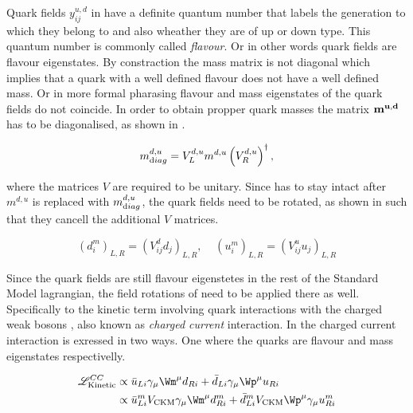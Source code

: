 Quark fields $y_{ij}^{u,d}$ in  have a definite quantum number that labels the generation to which they belong
to and also wheather they are of up or down type. This quantum number is commonly called {\it flavour}. Or in other words quark fields
are flavour eigenstates. By constraction the mass matrix is not diagonal which implies that
a quark with a well defined flavour does not have a well defined mass. Or in more formal pharasing flavour and mass eigenstates of
the quark fields do not coincide. In order to obtain propper quark masses the matrix $\bf m^{u,d}$ has to be diagonalised, as shown in .

\begin{equation}
  m^{d,u}_{\text diag} = V_L^{d,u} m^{d,u} \left(V_R^{d,u}\right)^{\dagger},
  \label{diagM}
\end{equation}

\noindent where the matrices $V$ are required to be unitary. Since  has to stay intact after $m^{d,u}$ is replaced with
$m^{d,u}_{\text diag}$, the quark fields need to be rotated, as shown in  such that they cancell the additional $V$ matrices.

\begin{equation}
  \left( d_{i}^m \right)_{L,R} = \left( V^d_{ij} d_{j} \right)_{L,R}, \;\;\;\; \left( u_{i}^m \right)_{L,R} = \left( V^u_{ij} u_{j} \right)_{L,R}
  \label{quark_rotation}
\end{equation}

\noindent Since the quark fields are still flavour eigenstetes in the rest of the Standard Model lagrangian,
the field rotations of  need to be applied there as well. Specifically
to the kinetic term involving quark interactions with the charged weak bosons \Wpm, also known as {\it charged current}
interaction. In  the charged current interaction is exressed in two ways. One where the quarks
are flavour and mass eigenstates respectivelly.

\begin{subequations}
  \label{CClagrangian}
  \begin{align}
    \mathscr{L}_{\text{Kinetic}}^{CC} & \propto \bar{u}_{Li} \gamma_\mu {\Wm}^\mu d_{Ri} + \bar{d}_{Li} \gamma_\mu {\Wp}^\mu u_{Ri}  \label{CClagrangianInt} \\
                                      & \propto \bar{u}_{Li}^m  {V_{\text{CKM}}} \gamma_\mu {\Wm}^\mu d_{Ri}^m + \bar{d}_{Li}^m V_{\text{CKM}} {\Wp}^\mu \gamma_\mu u_{Ri}^m \label{CClagrangianMass}
  \end{align}
\end{subequations}

